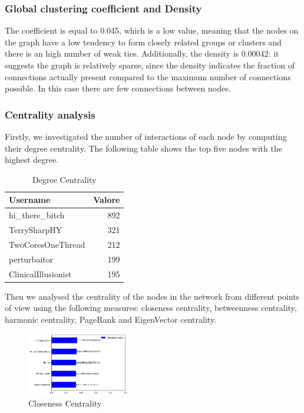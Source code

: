 \documentclass[sigchi]{acmart}
\begin{document}
\subsubsection{Global clustering coefficient and Density} The coefficient is equal to 0.045, which is a low value, meaning that the nodes on the graph have a low tendency to form closely related groups or clusters and there is an high number of weak ties. Additionally, the density is 0.00042: it suggests the graph is relatively sparse, since the density indicates the fraction of connections actually present compared to the maximum number of connections possible. In this case there are few connections between nodes.

\subsubsection{Centrality analysis}  
Firstly, we investigated the number of interactions of each node by computing their degree centrality. The following table shows the top five nodes with the highest degree.
\begin{table}[htbp]
\centering
\caption{Degree Centrality}
\begin{adjustbox}{scale=0.85}
\begin{tabular}{lr}
\toprule
Username & Valore \\
\midrule
hi\_there\_bitch & 892 \\
TerrySharpHY & 321 \\
TwoCoresOneThread & 212 \\
perturbaitor & 199 \\
ClinicalIllusionist & 195 \\
\bottomrule
\end{tabular}
\end{adjustbox}
\end{table}

Then we analysed the centrality of the nodes in the network from different points of view using the following measures: closeness centrality, betweenness centrality, harmonic centrality, PageRank and EigenVector centrality.



\begin{figure}[!ht]
  \centering
  \includegraphics[width=0.4\textwidth]{closeness.png}
  \caption{Closeness Centrality}
  \label{fig:closeness_centrality}
\end{figure}
\end{document}
